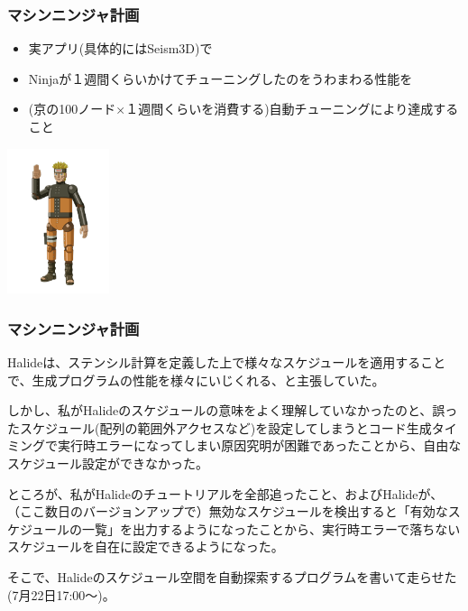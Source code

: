 \documentclass[dvipdfmx,cjk]{beamer}
\begin{document}
\begin{frame}\frametitle{マシンニンジャ計画}

\begin{itemize}
\item 実アプリ(具体的にはSeism3D)で
\item Ninjaが１週間くらいかけてチューニングしたのをうわまわる性能を
\item (京の100ノード×１週間くらいを消費する)自動チューニングにより達成すること
\end{itemize}


\begin{center}
\includegraphics[width=3cm]{figure/machine-ninja.jpg}
\end{center}
\end{frame}

\begin{frame}\frametitle{マシンニンジャ計画}
  Halideは、ステンシル計算を定義した上で様々なスケジュールを適用することで、生成プログラムの性能を様々にいじくれる、と主張していた。

  しかし、私がHalideのスケジュールの意味をよく理解していなかったのと、誤ったスケジュール(配列の範囲外アクセスなど)を設定してしまうとコード生成タイミングで実行時エラーになってしまい原因究明が困難であったことから、自由なスケジュール設定ができなかった。

  ところが、私がHalideのチュートリアルを全部追ったこと、およびHalideが、（ここ数日のバージョンアップで）無効なスケジュールを検出すると「有効なスケジュールの一覧」を出力するようになったことから、実行時エラーで落ちないスケジュールを自在に設定できるようになった。

  そこで、Halideのスケジュール空間を自動探索するプログラムを書いて走らせた(7月22日17:00〜)。
\end{frame}
\end{document}
